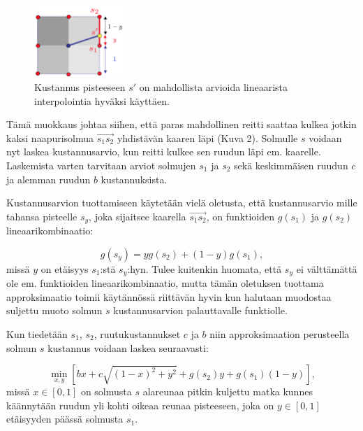 \documentclass[finnish]{tktltiki2}
\theoremstyle{definition}
\theoremstyle{remark}
\begin{document}
\begin{figure}[H]
	\centering
		\includegraphics[width=0.3\textwidth]{new_grid}
	\caption{Kustannus pisteeseen $s'$ on mahdollista arvioida lineaarista interpolointia hyväksi käyttäen. \cite{marsjuttuja}}
\end{figure}
Tämä muokkaus johtaa siihen, että paras mahdollinen reitti saattaa kulkea jotkin kaksi naapurisolmua $\overrightarrow{s_1s_2}$ yhdistävän kaaren läpi (Kuva 2). Solmulle \(s\) voidaan nyt laskea kustannusarvio, kun reitti kulkee sen ruudun läpi em. kaarelle. Laskemista varten tarvitaan arviot solmujen \(s_1\) ja \(s_2\) sekä keskimmäisen ruudun \(c\) ja alemman ruudun \(b\) kustannuksista.

Kustannusarvion tuottamiseen käytetään vielä oletusta, että kustannusarvio mille tahansa pisteelle \(s_y\), joka sijaitsee kaarella $\overrightarrow{s_1s_2}$, on funktioiden \(g(s_1)\) ja \(g(s_2)\) lineaarikombinaatio:

\begin{equation}
	g(s_y) = yg(s_2)+(1-y)g(s_1),
\end{equation}
missä \(y\) on etäisyys \(s_1\):stä \(s_y\):hyn. Tulee kuitenkin huomata, että \(s_y\) ei välttämättä ole em. funktioiden lineaarikombinaatio, mutta tämän oletuksen tuottama approksimaatio toimii käytännössä riittävän hyvin kun halutaan muodostaa suljettu muoto solmun \(s\) kustannusarvion palauttavalle funktiolle.

Kun tiedetään \(s_1\), \(s_2\), ruutukustannukset \(c\) ja \(b\) niin approksimaation perusteella solmun \(s\) kustannus voidaan laskea seuraavasti:

\begin{equation}
	\min_{x,y}[bx+c\sqrt{(1-x)^2+y^2}+g(s_2)y+g(s_1)(1-y)],
\end{equation}
missä $x \in [0,1]$ on solmusta $s$ alareunaa pitkin kuljettu matka kunnes käännytään ruudun yli kohti oikeaa reunaa pisteeseen, joka on $y \in [0,1]$ etäisyyden päässä solmusta $s_1$.
\end{document}
